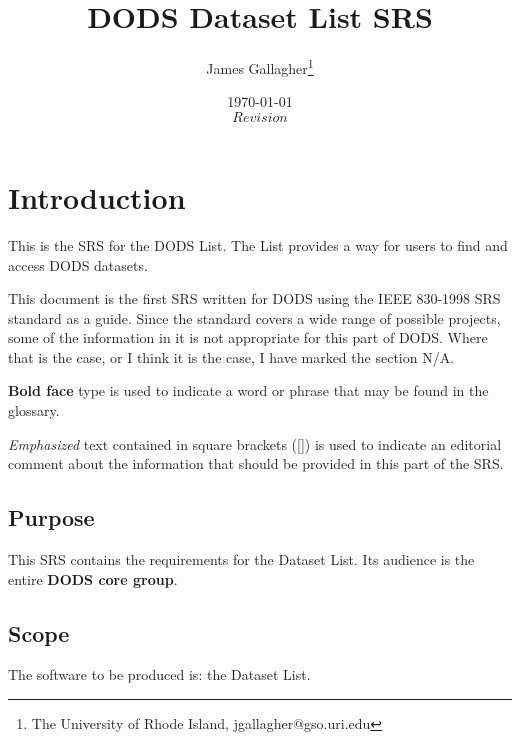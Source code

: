\documentclass{article}
\begin{document}
\title{DODS Dataset List SRS}
\author{James Gallagher\thanks{The University of Rhode Island,
    jgallagher@gso.uri.edu}}
\date{\today \\ $Revision$ }



\maketitle
\tableofcontents

\section{Introduction}

This is the \ac{SRS} for the DODS List. The List provides a way for users to
find and access DODS datasets.

This document is the first \ac{SRS} written for DODS using the IEEE 830-1998
\ac{SRS} standard as a guide. Since the standard covers a wide range of
possible projects, some of the information in it is not appropriate for this
part of DODS. Where that is the case, or I think it is the case, I have
marked the section N/A.

\textbf{Bold face} type is used to indicate a word or phrase that may be
found in the glossary.

\emph{Emphasized} text contained in square brackets ([]) is used to indicate
an editorial comment about the information that should be provided in this
part of the \ac{SRS}.


\subsection{Purpose}
This \ac{SRS} contains the requirements for the Dataset List. Its audience is
the entire \textbf{DODS core group}.

\subsection{Scope}
The software to be produced is: the Dataset List.
\end{document}
